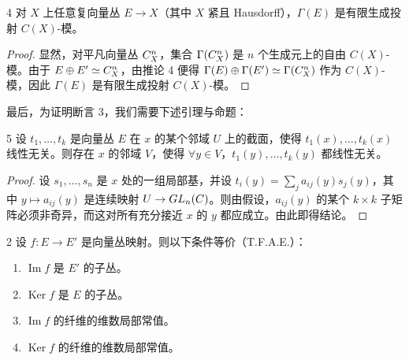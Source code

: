 \begin{lem}{4} 对 $X$ 上任意复向量丛 $E \to X$（其中 $X$ 紧且 Hausdorff），$\Gamma(E)$ 是有限生成投射 $C(X)$-模。\end{lem}

\begin{proof} 显然，对平凡向量丛 $C^n_X$，集合 $\Gamma(C^n_X)$ 是 $n$ 个生成元上的自由 $C(X)$-模。由于 $E \oplus E' \simeq C^n_X$，由推论 4 便得 $\Gamma(E) \oplus \Gamma(E') \simeq \Gamma(C^n_X)$ 作为 $C(X)$-模，因此 $\Gamma(E)$ 是有限生成投射 $C(X)$-模。\end{proof}

最后，为证明断言 3，我们需要下述引理与命题：

\begin{lem}{5} 设 $t_1, \dots, t_k$ 是向量丛 $E$ 在 $x$ 的某个邻域 $U$ 上的截面，使得 $t_1(x), \dots, t_k(x)$ 线性无关。则存在 $x$ 的邻域 $V$，使得 $\forall y \in V$，$t_1(y), \dots, t_k(y)$ 都线性无关。\end{lem}

\begin{proof} 设 $s_1, \dots, s_n$ 是 $x$ 处的一组局部基，并设 $t_i(y) = \sum_j a_{ij}(y)s_j(y)$，其中 $y \mapsto a_{ij}(y)$ 是连续映射 $U \to GL_n(C)$。则由假设，$a_{ij}(y)$ 的某个 $k \times k$ 子矩阵必须非奇异，而这对所有充分接近 $x$ 的 $y$ 都应成立。由此即得结论。\end{proof}

\begin{prop}{2} 设 $f : E \to E'$ 是向量丛映射。则以下条件等价（T.F.A.E.）：
\begin{enumerate}[label=(\arabic*)]
\item $\operatorname{Im}f$ 是 $E'$ 的子丛。
\item $\operatorname{Ker}f$ 是 $E$ 的子丛。
\item $\operatorname{Im}f$ 的纤维的维数局部常值。
\item $\operatorname{Ker}f$ 的纤维的维数局部常值。
\end{enumerate}
\end{prop}

